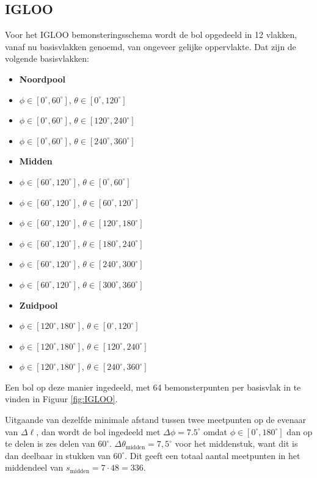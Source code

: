 \subsection{IGLOO}
Voor het IGLOO bemonsteringsschema \cite{Zhang2012575} wordt de bol opgedeeld in 12 vlakken, vanaf nu basisvlakken genoemd, van ongeveer gelijke oppervlakte. Dat zijn de volgende basisvlakken:
\begin{multicols}{2}
\begin{itemize}
\item[]\textbf{Noordpool}
\item $\phi\in[0^\circ,60^\circ]$, $\theta\in[0^\circ,120^\circ]$
\item $\phi\in[0^\circ,60^\circ]$, $\theta\in[120^\circ,240^\circ]$
\item $\phi\in[0^\circ,60^\circ]$, $\theta\in[240^\circ,360^\circ]$
\item[]\textbf{Midden}
\item $\phi\in[60^\circ,120^\circ]$, $\theta\in[0^\circ,60^\circ]$
\item $\phi\in[60^\circ,120^\circ]$, $\theta\in[60^\circ,120^\circ]$
\item $\phi\in[60^\circ,120^\circ]$, $\theta\in[120^\circ,180^\circ]$
\item $\phi\in[60^\circ,120^\circ]$, $\theta\in[180^\circ,240^\circ]$
\item $\phi\in[60^\circ,120^\circ]$, $\theta\in[240^\circ,300^\circ]$
\item $\phi\in[60^\circ,120^\circ]$, $\theta\in[300^\circ,360^\circ]$
\item[]\textbf{Zuidpool}
\item $\phi\in[120^\circ,180^\circ]$, $\theta\in[0^\circ,120^\circ]$
\item $\phi\in[120^\circ,180^\circ]$, $\theta\in[120^\circ,240^\circ]$
\item $\phi\in[120^\circ,180^\circ]$, $\theta\in[240^\circ,360^\circ]$
\end{itemize}
\end{multicols}
Een bol op deze manier ingedeeld, met 64 bemonsterpunten per basisvlak in te vinden in Figuur \ref{fig:IGLOO}.

Uitgaande van dezelfde minimale afstand tussen twee meetpunten op de evenaar van $\Delta\ell$, dan wordt de bol ingedeeld met $\Delta\phi=7.5^\circ$ omdat $\phi\in[0^\circ,180^\circ]$ dan op te delen is zes delen van $60^\circ$.
$\Delta\theta_\text{midden}=7,5^\circ$ voor het middenstuk, want dit is dan deelbaar in stukken van $60^\circ$.
Dit geeft een totaal aantal meetpunten in het middendeel van $s_\text{midden}=7\cdot48=336$.

